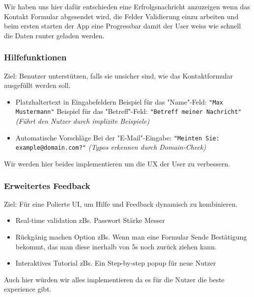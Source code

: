 \documentclass[10pt]{article}
\begin{document}
	Wir haben uns hier dafür entschieden eine Erfrolgsnachricht anzuzeigen wenn das Kontakt Formular abgesendet wird, die Felder Validierung einzu arbeiten und beim ersten starten der App eine Progressbar damit der User weiss wie schnell die Daten runter geladen werden.
	
	\subsubsection{Hilfefunktionen}
	
	Ziel: Benutzer unterstützen, falls sie unsicher sind, wie das Kontaktformular ausgefüllt werden soll.
	
	\begin{itemize}
		\item Platzhaltertext in Eingabefeldern
		\subitem Beispiel für das "Name"-Feld:
		\subsubitem \texttt{"Max Mustermann"}
		\subitem Beispiel für das "Betreff"-Feld:
		\subsubitem \texttt{"Betreff meiner Nachricht"}
		\subsubitem \textit{(Führt den Nutzer durch implizite Beispiele)}
		
		\item Automatische Vorschläge
		\subitem Bei der "E-Mail"-Eingabe:
		\subsubitem \texttt{"Meinten Sie: example@domain.com?"}
		\subsubitem \textit{(Typos erkennen durch Domain-Check)}
	\end{itemize}
	
	Wir werden hier beides implementieren um die UX der User zu verbessern.
	
	\subsubsection{Erweitertes Feedback}
	
	Ziel: Für eine Polierte UI, um Hilfe und Feedback dynamisch zu kombinieren.
	
	\begin{itemize} 
		\item Real-time validation
		\subitem zBs. Passwort Stärke Messer
		\item Rückgänig machen Option
		\subitem zBs. Wenn man eine Formular Sende Bestätigung bekommt, das man diese inerhalb von 5s noch zurück ziehen kann.
		\item Interaktives Tutorial
		\subitem zBs. Ein Step-by-step popup für neue Nutzer
	\end{itemize}
	
	Auch hier würden wir alles implementieren da es für die Nutzer die beste experience gibt.
	
\end{document}
